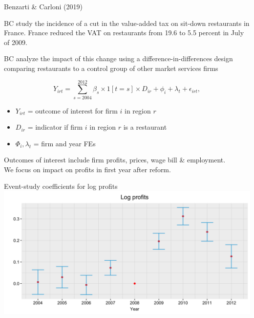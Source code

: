 \documentclass[aspectratio = 169, 13pt]{beamer}
\begin{document}
\begin{frame}{Benzarti \& Carloni (2019)}
\begin{wideitemize}
\item
BC study the incidence of a cut in the value-added tax on sit-down restaurants in France.
France reduced the VAT on restaurants from 19.6 to 5.5 percent in July of 2009. 

\item
BC analyze the impact of this change using a difference-in-differences design comparing restaurants to a control group of other market services firms


\begin{equation}
Y_{irt} = \sum_{s = 2004}^{2012} \beta_s \times 1[t = s] \times  D_{ir} + \phi_i + \lambda_t + \epsilon_{irt} , \label{eqn: bc event-study spec}    
\end{equation}

\noindent \begin{itemize}
    \item $Y_{irt}$ = outcome of interest for firm $i$ in region $r$
    \item $D_{ir}$ = indicator if firm $i$ in region $r$ is a restaurant
    \item $\Phi_i, \lambda_t$ = firm and year FEs
\end{itemize}

\item Outcomes of interest include firm profits, prices, wage bill \& employment.\\
We focus on impact on profits in first year after reform.
\end{wideitemize}
\end{frame}

\begin{frame}{Event-study coefficients for log profits}
    \centering
    \includegraphics[width = 0.8 \textwidth]{figures/Benzarti-Carloni/profits-event-study.png}
\end{frame}
\end{document}
